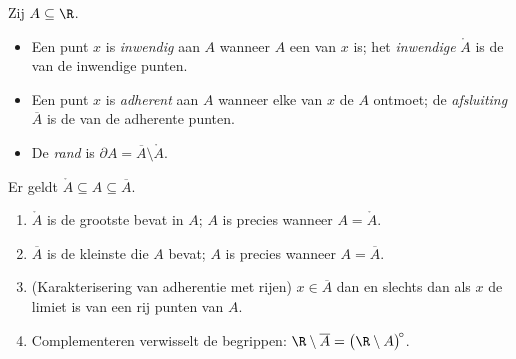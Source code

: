 \begin{definition}\label{def:b1:topology:closure}
Zij $A \subseteq \R$.
\begin{itemize}
  \item Een punt $x$ is \emph{inwendig} aan $A$ wanneer $A$ een 
        van $x$ is; het \emph{inwendige} $\mathring{A}$
        is de  van de inwendige punten.
  \item Een punt $x$ is \emph{adherent} aan $A$ wanneer elke 
        van $x$ de  $A$ ontmoet; de \emph{afsluiting}
        $\overline{A}$ is de  van de
        adherente punten.
  \item De \emph{rand} is $\partial A = \overline A \setminus \mathring
        A$.
\end{itemize}
Er geldt $\mathring A \subseteq A \subseteq \overline A$.
\end{definition}

\begin{proposition}[Hoofdeigenschappen]\label{prop:b1:topology:closureprops}
\begin{enumerate}
  \item $\mathring A$ is de grootste  bevat in $A$; $A$
        is  precies wanneer $A = \mathring A$.
  \item $\overline A$ is de kleinste  die $A$ bevat;
        $A$ is  precies wanneer $A = \overline A$.
  \item (Karakterisering van adherentie met rijen) $x \in \overline A$
        dan en slechts dan als $x$ de limiet is van een rij punten van
        $A$.
  \item Complementeren verwisselt de begrippen: $\R \setminus \overline
        A = \bigl(\R \setminus A\bigr)^{\!\circ}$.
\end{enumerate}
\end{proposition}

